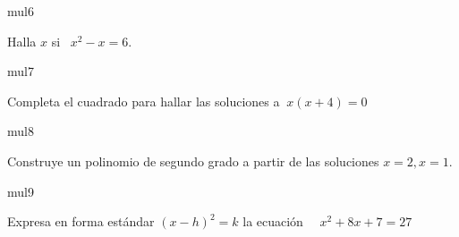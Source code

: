 \documentclass[a4paper]{article}
\begin{document}
\begin{question}{mul6}

        Halla \(x\) si \ \( x^2 - x = 6  \).
        
   \begin{choices}
\end{choices}
        
\end{question}

\begin{question}{mul7}

        Completa el cuadrado para hallar las soluciones a $\ x(x+4) = 0 $
        
   \begin{choices}
   \end{choices}
        
        
\end{question}

\begin{question}{mul8}

        Construye un polinomio de segundo grado a partir de las soluciones \(x=2, x=1\).

        \begin{choices}
        \end{choices}
        
\end{question}

\begin{question}{mul9}
        
         Expresa en forma estándar \((x-h)^2 = k\) la ecuación   \ \ \(x^2 + 8x+7= 27\)
         
    \begin{choices}
   \end{choices}
        
\end{question}
\end{document}
